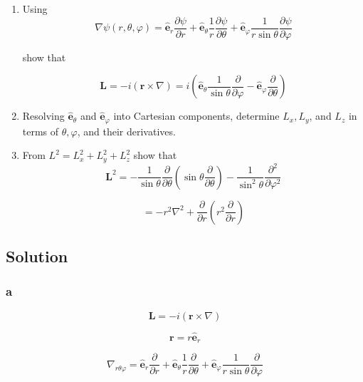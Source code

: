 \documentclass[12pt]{article}
\begin{document}
\begin{enumerate}[label= \textbf{(\alph*)}]
    \item Using
          \[
              \nabla \psi (r, \theta, \varphi) = \hat{\textbf{e}}_r \frac{\partial \psi}{\partial r}
              + \hat{\textbf{e}}_\theta \frac{1}{r} \frac{\partial \psi}{\partial \theta}
              + \hat{\textbf{e}}_\varphi \frac{1}{r \sin{\theta}} \frac{\partial \psi}{\partial \varphi}
          \]

          show that

          \[
              \textbf{L} = -i \left(\textbf{r} \times \nabla\right)
              = i
              \left(
              \hat{\textbf{e}}_\theta \frac{1}{\sin{\theta}} \frac{\partial}{\partial \varphi}
              - \hat{\textbf{e}}_\varphi \frac{\partial}{\partial \theta}
              \right)
          \]

    \item Resolving \(\hat{\textbf{e}}_\theta \) and \(\hat{\textbf{e}}_\varphi \)
          into Cartesian components, determine \(L_x, L_y\), and \(L_z\) in terms of
          \(\theta , \varphi \), and their derivatives.

    \item From \(L^2 = L_x^2 + L_y^2 + L_z^2\) show that
          \[
              \textbf{L}^2 = -\frac{1}{\sin{\theta}} \frac{\partial}{\partial \theta}
              \left(\sin{\theta} \frac{\partial}{\partial \theta}\right)
              - \frac{1}{\sin^2{\theta}} \frac{\partial^2}{\partial \varphi^2}
          \]

          \[
              = -r^2 \nabla^2 + \frac{\partial}{\partial r} \left(r^2 \frac{\partial}{\partial r}\right)
          \]
\end{enumerate}

\subsection{Solution}

\subsubsection{a}

\[
    \textbf{L} = -i \left(\textbf{r} \times \nabla\right)
\]

\[
    \textbf{r} = r \hat{\textbf{e}}_r
\]

\[
    \nabla_{r \theta \varphi } = \hat{\textbf{e}}_r \frac{\partial}{\partial r}
    + \hat{\textbf{e}}_\theta \frac{1}{r} \frac{\partial}{\partial \theta}
    + \hat{\textbf{e}}_\varphi \frac{1}{r \sin{\theta}} \frac{\partial}{\partial \varphi}
\]
\end{document}
